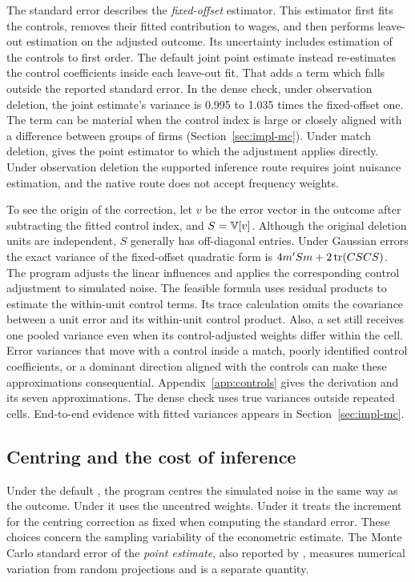 The standard error describes the \emph{fixed-offset} estimator. This estimator
first fits the controls, removes their fitted contribution to wages, and then
performs leave-out estimation on the adjusted outcome. Its uncertainty includes
estimation of the controls to first order. The default joint point estimate
instead re-estimates the control coefficients inside each leave-out fit. That
adds a term which falls outside the reported standard error. In the dense check, under
observation deletion, the joint estimate's variance is 0.995 to 1.035 times the
fixed-offset one. The term can
be material when the control index is large or closely aligned with a difference
between groups of firms (Section~\ref{sec:impl-mc}). Under match deletion,
 gives the point estimator to which the adjustment
applies directly. Under observation deletion the supported inference route requires
joint nuisance estimation, and the native route does not accept frequency weights.

To see the origin of the correction, let $v$ be the error vector in the
outcome after subtracting the fitted control index, and $S=\mathbb{V}[v]$. Although
the original deletion units are independent, $S$ generally has off-diagonal
entries. Under Gaussian errors the exact variance of the fixed-offset
quadratic form is $4m'Sm+2\operatorname{tr}(CSCS)$. The program adjusts the linear
influences and applies the corresponding control adjustment to simulated
noise. The feasible formula uses residual products to estimate the
within-unit control terms. Its trace calculation omits the covariance between
a unit error and its within-unit control product. Also, a set still receives
one pooled variance even when its control-adjusted weights differ within the
cell. Error variances that move with a control inside a match, poorly identified
control coefficients, or a dominant direction aligned with the controls can
make these approximations consequential. Appendix~\ref{app:controls} gives
the derivation and its seven approximations. The dense check uses true variances
outside repeated cells. End-to-end evidence with fitted variances appears in
Section~\ref{sec:impl-mc}.

\subsection{Centring and the cost of inference}\label{sec:computation}
Under the default , the program centres the simulated
noise in the same way as the outcome. Under  it uses
the uncentred weights. Under  it treats the
increment for the centring correction as fixed when computing the standard
error. These choices concern the sampling variability of the econometric
estimate. The Monte Carlo standard error of the \emph{point estimate}, also
reported by \fevc{}, measures numerical variation from random projections and is a
separate quantity.

